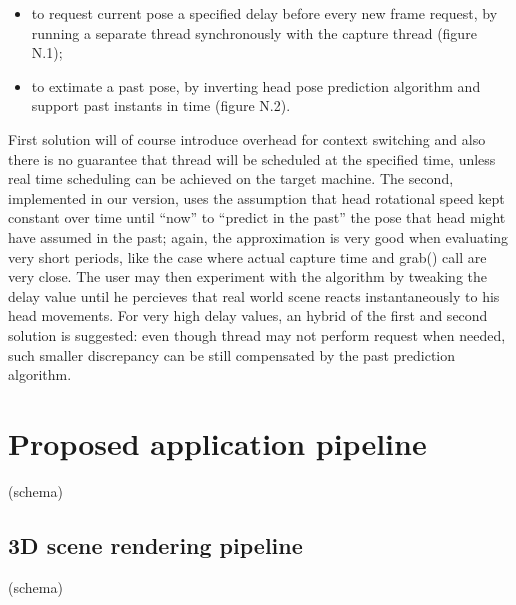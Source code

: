 \begin{itemize}
\item to request current pose a specified delay before every new frame request, by running a separate thread synchronously with the capture thread (figure N.1);
\item to extimate a past pose, by inverting head pose prediction algorithm and support past instants in time (figure N.2).
\end{itemize}
First solution will of course introduce overhead for context switching and also there is no guarantee that thread will be scheduled at the specified time, unless real time scheduling can be achieved on the target machine. The second, implemented in our version, uses the assumption that head rotational speed kept constant over time until “now” to “predict in the past” the pose that head might have assumed in the past; again, the approximation is very good when evaluating very short periods, like the case where actual capture time and grab() call are very close. The user may then experiment with the algorithm by tweaking the delay value until he percieves that real world scene reacts instantaneously to his head movements. For very high delay values, an hybrid of the first and second solution is suggested: even though thread may not perform request when needed, such smaller discrepancy can be still compensated by the past prediction algorithm.

\section{Proposed application pipeline}

(schema)

\subsection{3D scene rendering pipeline}

(schema)

